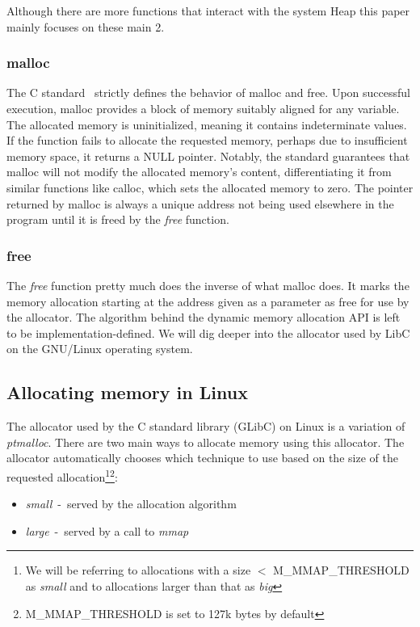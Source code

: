 \documentclass{article}
\begin{document}
Although there are more functions that interact with the system Heap this paper mainly focuses on these main 2.

\subsubsection{malloc}
The C standard~\cite[p.~154-157]{ANSI_C} strictly defines the behavior of malloc and free. Upon successful execution, malloc provides a block of memory suitably aligned for any variable. The allocated memory is uninitialized, meaning it contains indeterminate values. If the function fails to allocate the requested memory, perhaps due to insufficient memory space, it returns a NULL pointer. Notably, the standard guarantees that malloc will not modify the allocated memory's content, differentiating it from similar functions like calloc, which sets the allocated memory to zero. The pointer returned by malloc is always a unique address not being used elsewhere in the program until it is freed by the \emph{free} function.

\subsubsection{free}
The \emph{free} function pretty much does the inverse of what malloc does. It marks the memory allocation starting at the address given as a parameter as free for use by the allocator. The algorithm behind the dynamic memory allocation API is left to be implementation-defined. We will dig deeper into the allocator used by LibC on the GNU/Linux operating system.

\subsection{Allocating memory in Linux}
The allocator used by the C standard library (GLibC) on Linux is a variation of \emph{ptmalloc}. There are two main ways to allocate memory using this allocator. The allocator automatically chooses which technique to use based on the size of the requested allocation\footnote{We will be referring to allocations with a size $<$ {M\_MMAP\_THRESHOLD} as \emph{small} and to allocations larger than that as \emph{big}}\footnote{{M\_MMAP\_THRESHOLD} is set to 127k bytes by default}:
\begin{itemize}
  \item \emph{small}~-~served by the allocation algorithm
  \item \emph{large}~-~served by a call to \emph{mmap}
\end{itemize}
\end{document}
